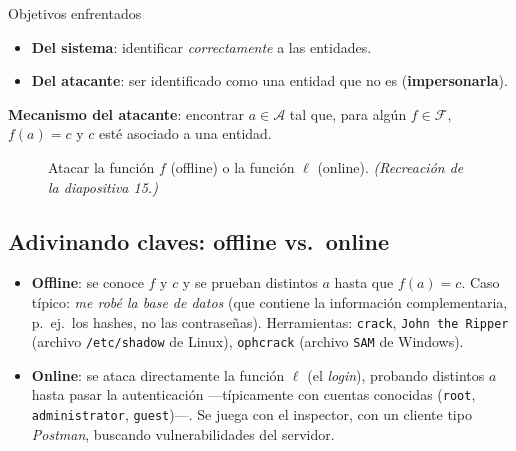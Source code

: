 \documentclass[11pt,a4paper]{article}
\newcommand{\Aset}{\mathcal{A}}
\newcommand{\Fset}{\mathcal{F}}
\newcommand{\Lset}{\mathcal{L}}
\begin{document}
\begin{defbox}{Objetivos enfrentados}
\begin{itemize}[leftmargin=1.4em,itemsep=1pt]
  \item \textbf{Del sistema}: identificar \emph{correctamente} a las entidades.
  \item \textbf{Del atacante}: ser identificado como una entidad que no es
        (\textbf{impersonarla}).
\end{itemize}
\textbf{Mecanismo del atacante}: encontrar $a\in\Aset$ tal que, para algún $f\in\Fset$,
$f(a)=c$ y $c$ esté asociado a una entidad.
\end{defbox}

\begin{figure}[h]
\centering
{}
\caption{Atacar la función $f$ (offline) o la función $\ell$ (online).
\textit{(Recreación de la diapositiva 15.)}}
\end{figure}

\subsection{Adivinando claves: offline vs.\ online}
\begin{itemize}[leftmargin=1.4em,itemsep=2pt]
  \item \textbf{Offline}: se conoce $f$ y $c$ y se prueban distintos $a$ hasta que $f(a)=c$.
        Caso típico: \emph{me robé la base de datos} (que contiene la información
        complementaria, p.\ ej.\ los hashes, no las contraseñas). Herramientas: \texttt{crack},
        \texttt{John the Ripper} (archivo \texttt{/etc/shadow} de Linux), \texttt{ophcrack}
        (archivo \texttt{SAM} de Windows).
  \item \textbf{Online}: se ataca directamente la función $\ell$ (el \emph{login}), probando
        distintos $a$ hasta pasar la autenticación —típicamente con cuentas conocidas
        (\texttt{root}, \texttt{administrator}, \texttt{guest})—. Se juega con el inspector,
        con un cliente tipo \emph{Postman}, buscando vulnerabilidades del servidor.
\end{itemize}
\end{document}
